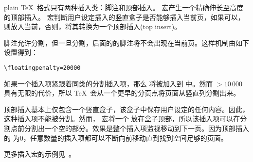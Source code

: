 \documentclass{book}
\begin{document}
plain \TeX\ 格式只有两种插入类：脚注和顶部插入。
 宏产生一个精确伸长至高度的顶部插入。
 宏判断用户设定插入的竖直盒子是否能够插入当前页，如果可以，则放入当前，否则，将其转换为一个顶部插入(top insert)。


脚注允许分割，但一旦分割，后面的的脚注将不会出现在当前页。这样机制由如下设置得到：

\begin{verbatim}
\floatingpenalty=20000
\end{verbatim}

如果一个插入项紧跟着同类的分割插入项，那么  将被加入到 中。然而 ${}>10\,000$ 具有无限的代价，所以 \TeX\ 会从一个更早的分页点将页面从竖直列分割出来。



顶部插入基本上仅包含一个竖直盒子，该盒子中保存用户设定的任何内容。因此，这种插入项不能被分割。然而， 宏将一个  放在盒子顶部，所以该插入项可以在分割点前分割出一个空的部分。效果是整个插入项监视移动到下一页。因为顶部插入的  为0，任意数量的插入项都可以不断向前移动直到找到空间足够的页面。


更多插入宏的示例见~\cite{Sal3}。



\endofchapter
\end{document}

